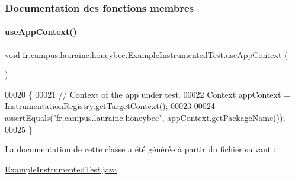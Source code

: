 \subsubsection{Documentation des fonctions membres}
\mbox{\label{classfr_1_1campus_1_1laurainc_1_1honeybee_1_1_example_instrumented_test_a9474da2c6615d495569abe302049f465}} 
\paragraph{\texorpdfstring{use\+App\+Context()}{useAppContext()}}
{\footnotesize\ttfamily void fr.\+campus.\+laurainc.\+honeybee.\+Example\+Instrumented\+Test.\+use\+App\+Context (\begin{DoxyParamCaption}{ }\end{DoxyParamCaption})}


\begin{DoxyCode}
00020                                 \{
00021         \textcolor{comment}{// Context of the app under test.}
00022         Context appContext = InstrumentationRegistry.getTargetContext();
00023 
00024         assertEquals(\textcolor{stringliteral}{"fr.campus.laurainc.honeybee"}, appContext.getPackageName());
00025     \}
\end{DoxyCode}


La documentation de cette classe a été générée à partir du fichier suivant \+:\begin{DoxyCompactItemize}
\item 
\hyperlink{_example_instrumented_test_8java}{Example\+Instrumented\+Test.\+java}\end{DoxyCompactItemize}
